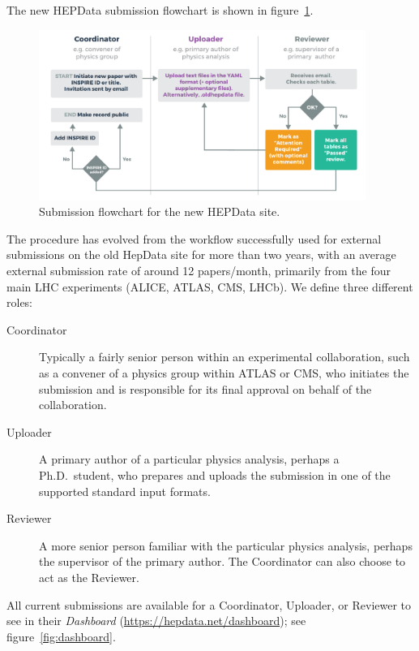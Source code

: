 \documentclass[a4paper]{jpconf}
\begin{document}
The new HEPData submission flowchart is shown in figure~\ref{fig:submission}.
%
\begin{figure}
  \begin{center}
    \includegraphics[width=0.95\textwidth]{Figures/submission_flow_updated.pdf}
  \end{center}
  \caption{\label{fig:submission}Submission flowchart for the new HEPData site.}
\end{figure}
%
The procedure has evolved from the workflow successfully used for external
submissions on the old HepData site for more than two years, with an average
external submission rate of around 12 papers/month, primarily from the four
main LHC experiments (ALICE, ATLAS, CMS, LHCb).  We define three different
roles:
%
\begin{description}
\item [Coordinator] Typically a fairly senior person within an experimental
collaboration, such as a convener of a physics group within ATLAS or CMS, who
initiates the submission and is responsible for its final approval on behalf of
the collaboration.
\item [Uploader] A primary author of a particular physics analysis, perhaps a
Ph.D.~student, who prepares and uploads the submission in one of the supported
standard input formats.
\item [Reviewer] A more senior person familiar with the particular physics
analysis, perhaps the supervisor of the primary author.  The Coordinator can
also choose to act as the Reviewer.
\end{description}
%
All current submissions are available for a Coordinator, Uploader, or Reviewer
to see in their \emph{Dashboard} (\url{https://hepdata.net/dashboard}); see
figure~\ref{fig:dashboard}.
%
\end{document}
